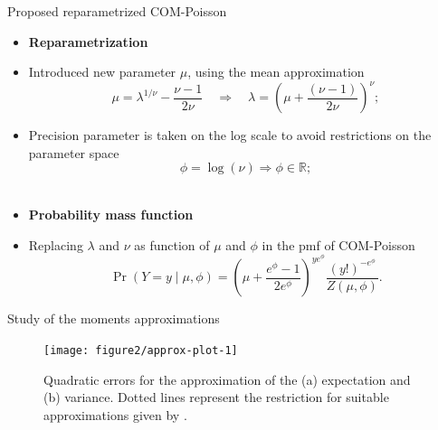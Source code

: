 \documentclass[11pt]{beamer}\usepackage[]{graphicx}\usepackage[]{color}
\begin{document}
\begin{frame}{Proposed reparametrized COM-Poisson}

\begin{itemize}
  \item[] {\bf Reparametrization}
  \item Introduced new parameter $\mu$, using the mean
    approximation\\[-0.2cm]
    \begin{equation*}
      \label{eqn:repar-cmp}
      \mu = \lambda^{1/\nu} - \frac{\nu - 1}{2\nu}
      \quad \Rightarrow \quad
      \lambda = \left (\mu +
        \frac{(\nu - 1)}{2\nu} \right )^\nu;
    \end{equation*}
  \item Precision parameter is taken on the log scale to avoid
    restrictions on the parameter space\\[-0.3cm]
    $$\phi = \log(\nu) \Rightarrow \phi \in \mathbb{R};$$\\[0.3cm]
  \item[] {\bf Probability mass function}
  \item Replacing $\lambda$ and $\nu$ as function of $\mu$ and $\phi$ in
    the pmf of COM-Poisson\\[-0.2cm]
    \begin{equation*}
      \label{eqn:pmf-cmpmu}
      \Pr(Y=y \mid \mu, \phi) =
      \left ( \mu +\frac{ e^\phi-1}{2e^\phi} \right )^{ye^\phi}
      \frac{(y!)^{-e^\phi}}{Z(\mu, \phi)}.
    \end{equation*}
\end{itemize}

\end{frame}

\begin{frame}{Study of the moments approximations}

\begin{figure}[!htb]

{\centering \texttt{[image: figure2/approx-plot-1]} 

}

\caption[Quadratic errors for the approximation of the (a) expectation and (b) variance]{Quadratic errors for the approximation of the (a) expectation and (b) variance. Dotted lines represent the restriction for suitable approximations given by \cite{Shmueli2005}.}\label{fig:approx-plot}
\end{figure}



\end{frame}
\end{document}
